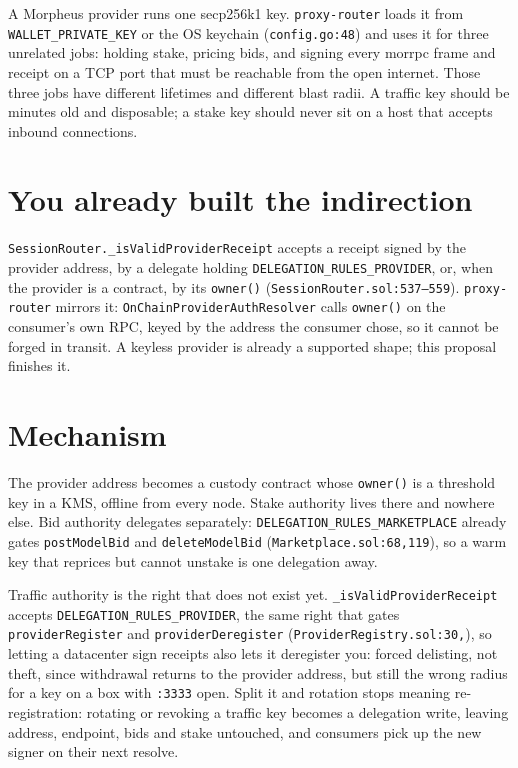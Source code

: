 \documentclass[10pt,a4paper]{article}
\begin{document}
\sloppy


A Morpheus provider runs one secp256k1 key. \texttt{proxy-router} loads it from \texttt{WALLET\_PRIVATE\_KEY} or the OS keychain (\texttt{config.go:48}) and uses it for three unrelated jobs: holding stake, pricing bids, and signing every morrpc frame and receipt on a TCP port that must be reachable from the open internet. Those three jobs have different lifetimes and different blast radii. A traffic key should be minutes old and disposable; a stake key should never sit on a host that accepts inbound connections.

\section*{You already built the indirection}

\texttt{SessionRouter.\allowbreak \_isValid\allowbreak ProviderReceipt} accepts a receipt signed by the provider address, by a delegate holding \texttt{DELEGATION\_\allowbreak RULES\_\allowbreak PROVIDER}, or, when the provider is a contract, by its \texttt{owner()} (\texttt{SessionRouter.\allowbreak sol:537--559}). \texttt{proxy-router} mirrors it: \texttt{OnChain\allowbreak ProviderAuthResolver} calls \texttt{owner()} on the consumer's own RPC, keyed by the address the consumer chose, so it cannot be forged in transit. A keyless provider is already a supported shape; this proposal finishes it.

\section*{Mechanism}

The provider address becomes a custody contract whose \texttt{owner()} is a threshold key in a KMS, offline from every node. Stake authority lives there and nowhere else. Bid authority delegates separately: \texttt{DELEGATION\_\allowbreak RULES\_\allowbreak MARKETPLACE} already gates \texttt{postModelBid} and \texttt{deleteModelBid} (\texttt{Marketplace.sol:68,119}), so a warm key that reprices but cannot unstake is one delegation away.

Traffic authority is the right that does not exist yet. \texttt{\_isValid\allowbreak ProviderReceipt} accepts \texttt{DELEGATION\_\allowbreak RULES\_\allowbreak PROVIDER}, the same right that gates \texttt{provider\allowbreak Register} and \texttt{provider\allowbreak Deregister} (\texttt{ProviderRegistry.\allowbreak sol:30,}), so letting a datacenter sign receipts also lets it deregister you: forced delisting, not theft, since withdrawal returns to the provider address, but still the wrong radius for a key on a box with \texttt{:3333} open. Split it and rotation stops meaning re-registration: rotating or revoking a traffic key becomes a delegation write, leaving address, endpoint, bids and stake untouched, and consumers pick up the new signer on their next resolve.
\end{document}
